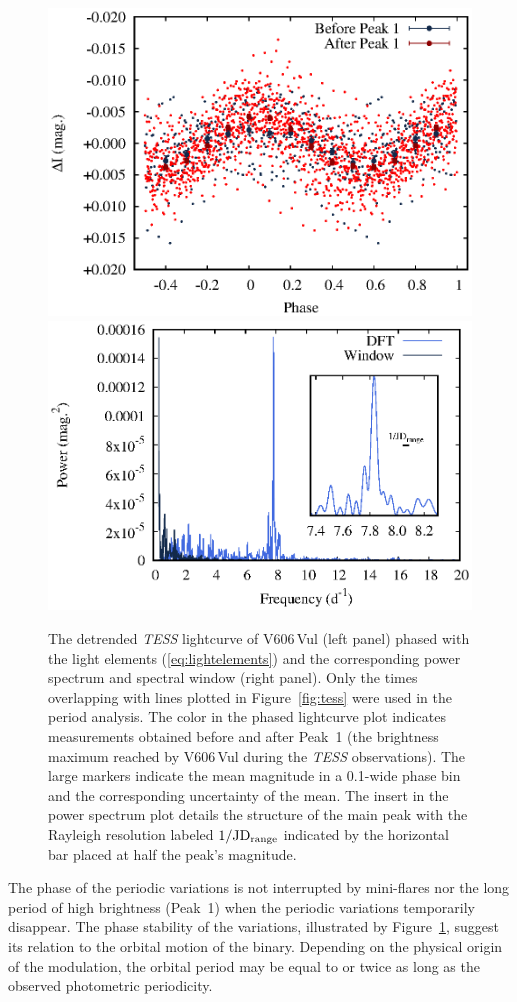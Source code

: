 \documentclass[twocolumn]{aastex631}
\newcommand{\nova}{V606\,Vul}
\begin{document}
\begin{figure}
\centering
        \includegraphics[width=0.48\linewidth,clip=true,trim=0.0cm 0cm 0cm 0cm,angle=0]{plot_phased_lc_beforeafter_bin.eps}
        \includegraphics[width=0.48\linewidth,clip=true,trim=0.0cm 0cm 0cm 0cm,angle=0]{periodogram.eps}
\caption{The detrended {\em TESS} lightcurve of \nova{} (left panel) phased with 
the light elements (\ref{eq:lightelements}) and the corresponding power spectrum and spectral window (right panel).
Only the times overlapping with lines plotted in Figure~\ref{fig:tess} were used in the period analysis.
The color in the phased lightcurve plot indicates measurements obtained before and after Peak~1 
(the brightness maximum reached by \nova{} during the {\em TESS} observations). The large markers indicate 
the mean magnitude in a 0.1-wide phase bin and the corresponding uncertainty of the mean.
The insert in the power spectrum plot details the structure of the main peak
with the Rayleigh resolution labeled $1/{\rm JD}_{\rm range}$ indicated by
the horizontal bar placed at half the peak's magnitude.}
    \label{fig:phasedlightcurve}
\end{figure}


The phase of the periodic variations is not interrupted by mini-flares 
nor the long period of high brightness (Peak~1) when the periodic variations
temporarily disappear. The phase stability of the variations, illustrated by
Figure~\ref{fig:phasedlightcurve}, suggest its relation to the orbital
motion of the binary. Depending on the physical origin of the
modulation, the orbital period may be equal to or twice as long as the
observed photometric periodicity.
\end{document}
